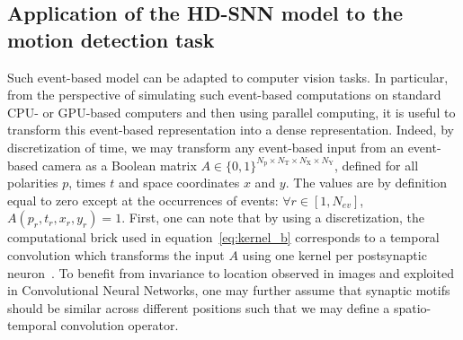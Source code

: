 \documentclass[default]{sn-jnl}%
\theoremstyle{thmstyleone}%
\theoremstyle{thmstyletwo}%
\theoremstyle{thmstylethree}%
\newcommand{\numevent}{N_{ev}} %
\newcommand{\Npol}{N_\text{p}} %
\newcommand{\arank}{r} %
\newcommand{\polev}{p} %
\newcommand{\Nx}{N_\text{X}}
\newcommand{\Ny}{N_\text{Y}}
\newcommand{\Ntime}{N_\text{T}}
\newcommand{\kernel}{\mathcal{K}} %
\newcommand{\class}{c} %
\begin{document}
\subsection{Application of the HD-SNN model to the motion detection task}
%
Such event-based model can be adapted to computer vision tasks. In particular, from the perspective of simulating such event-based computations on standard CPU- or GPU-based computers and then using parallel computing, it is useful to transform this event-based representation into a dense representation. Indeed, by discretization of time, we may transform any event-based input from an event-based camera as a Boolean matrix $A \in \{0, 1 \}^{\Npol \times \Ntime \times \Nx \times \Ny}$, defined for all polarities $p$, times $t$ and space coordinates $x$ and $y$. The values are by definition equal to zero except at the occurrences of events: $\forall \arank \in [1,\numevent]$, $A(\polev_\arank, t_\arank, x_\arank, y_\arank)=1$. First, one can note that by using a discretization, the computational brick used in equation~\eqref{eq:kernel_b} corresponds to a temporal convolution which transforms the input $A$ using one kernel per postsynaptic neuron~\citep{grimaldi_learning_2022}. To benefit from invariance to location observed in images and exploited in Convolutional Neural Networks, one may further assume that synaptic motifs should be similar across different positions such that we may define a spatio-temporal convolution operator. %
\end{document}

